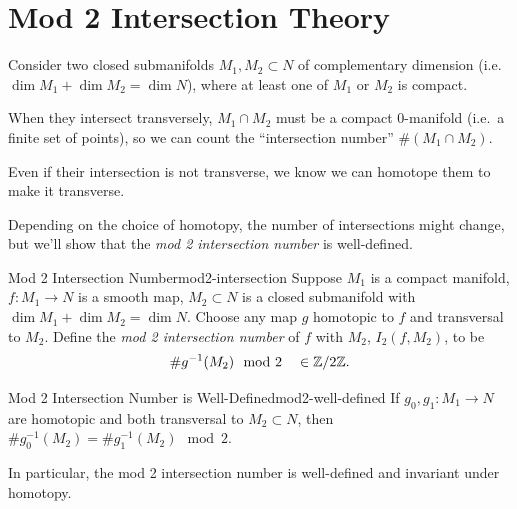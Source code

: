 
\section{Mod 2 Intersection Theory}

Consider two closed submanifolds $M_1, M_2 \subset N$ of complementary dimension (i.e.\ $\dim M_1 + \dim M_2 = \dim N$), where at least one of $M_1$ or $M_2$ is compact.

When they intersect transversely, $M_1 \cap M_2$ must be a compact $0$-manifold (i.e.\ a finite set of points), so we can count the ``intersection number'' $\#(M_1 \cap M_2)$.

Even if their intersection is not transverse, we know we can homotope them to make it transverse.

\begin{center}
\end{center}

Depending on the choice of homotopy, the number of intersections might change, but we'll show that the \emph{mod 2 intersection number} is well-defined.

\begin{definition}{Mod 2 Intersection Number}{mod2-intersection}
    Suppose $M_1$ is a compact manifold, $f \colon M_1 \to N$ is a smooth map, $M_2 \subset N$ is a closed submanifold with $\dim M_1 + \dim M_2 = \dim N$. Choose any map $g$ homotopic to $f$ and transversal to $M_2$. Define the \emph{mod 2 intersection number} of $f$ with $M_2$, $I_2(f, M_2)$, to be
    \[
        \# g^{-1}(M_2) \mod 2 \quad \in \mathbb{Z}/2\mathbb{Z}.
    \]
\end{definition}

\begin{theorem}{Mod 2 Intersection Number is Well-Defined}{mod2-well-defined}
    If $g_0, g_1 \colon M_1 \to N$ are homotopic and both transversal to $M_2 \subset N$, then $\# g_0^{-1}(M_2) = \# g_1^{-1}(M_2) \mod 2$.

    In particular, the mod 2 intersection number is well-defined and invariant under homotopy.
\end{theorem}

